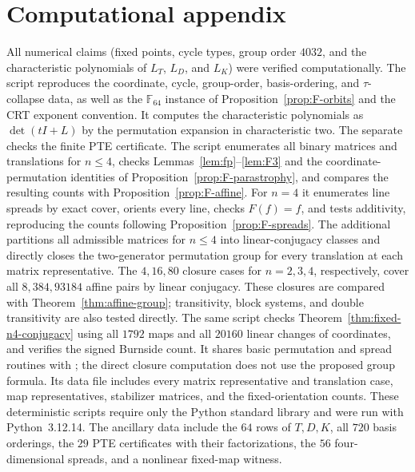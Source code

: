 \documentclass[11pt]{article}
\begin{document}
\section{Computational appendix}\label{app:code}
All numerical claims (fixed points, cycle types, group order $4032$, and the
characteristic polynomials of $L_T$, $L_D$, and $L_K$) were verified
computationally. The script  reproduces
the coordinate, cycle, group-order, basis-ordering, and $\tau$-collapse data,
as well as the $\mathbb F_{64}$ instance of Proposition~\ref{prop:F-orbits}
and the CRT exponent convention. It computes the characteristic polynomials
as $\det(tI+L)$ by the permutation expansion in characteristic two.
The separate  checks the finite PTE certificate.
The script  enumerates all binary
matrices and translations for $n\le4$, checks Lemmas~\ref{lem:fp}--\ref{lem:F3}
and the coordinate-permutation identities of Proposition~\ref{prop:F-parastrophy},
and compares the resulting counts with Proposition~\ref{prop:F-affine}.
For $n=4$ it enumerates line spreads by exact cover, orients every line,
checks $F(f)=f$, and tests additivity, reproducing the counts following
Proposition~\ref{prop:F-spreads}.
The additional  partitions all
admissible matrices for $n\le4$ into linear-conjugacy classes and directly
closes the two-generator permutation group for every translation at each
matrix representative. The $4,16,80$ closure cases for $n=2,3,4$, respectively,
cover all $8,384,93184$ affine pairs by linear conjugacy. These closures are
compared with Theorem~\ref{thm:affine-group}; transitivity, block systems,
and double transitivity are also tested directly. The same script checks
Theorem~\ref{thm:fixed-n4-conjugacy} using all $1792$ maps and all $20160$
linear changes of coordinates, and verifies the signed Burnside count.
It shares basic permutation and spread routines with
; the direct closure computation
does not use the proposed group formula. Its data file
 includes every matrix
representative and translation case, map representatives, stabilizer matrices,
and the fixed-orientation counts.
These deterministic scripts require only the Python standard library and were
run with Python~3.12.14. The ancillary data include the $64$ rows of $T,D,K$,
all $720$ basis orderings, the $29$ PTE certificates with their factorizations,
the $56$ four-dimensional spreads, and a nonlinear fixed-map witness.
\end{document}
